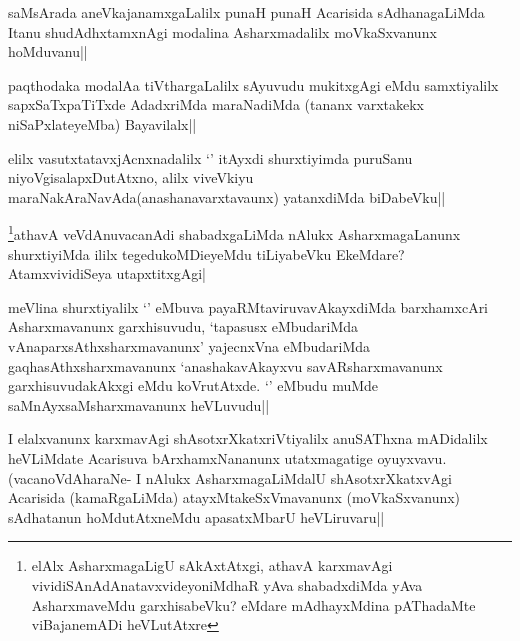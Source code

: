 \begin{artha}
saMsArada aneVkajanamxgaLalilx punaH punaH Acarisida sAdhanagaLiMda Itanu shudAdhxtamxnAgi modalina Asharxmadalilx moVkaSxvanunx hoMduvanu||
\end{artha}


\begin{artha}
paqthodaka modalAa tiVthargaLalilx sAyuvudu mukitxgAgi eMdu samxtiyalilx sapxSaTxpaTiTxde AdadxriMda maraNadiMda (tananx varxtakekx niSaPxlateyeMba) Bayavilalx||
\end{artha}

\begin{artha}
elilx vasutxtatavxjAcnxnadalilx `\stext' itAyxdi shurxtiyimda puruSanu niyoVgisalapxDutAtxno, alilx viveVkiyu maraNakAraNavAda(anashanavarxtavaunx) yatanxdiMda biDabeVku||
\end{artha}

\begin{artha}
\footnote{elAlx AsharxmagaLigU sAkAxtAtxgi, athavA karxmavAgi vividiSAnAdAnatavxvideyoniMdhaR yAva shabadxdiMda yAva AsharxmaveMdu garxhisabeVku? eMdare mAdhayxMdina pAThadaMte viBajanemADi heVLutAtxre}athavA veVdAnuvacanAdi shabadxgaLiMda nAlukx AsharxmagaLanunx shurxtiyiMda ililx tegedukoMDieyeMdu tiLiyabeVku EkeMdare? AtamxvividiSeya utapxtitxgAgi|
\end{artha}


\begin{artha}
meVlina shurxtiyalilx `\stext' eMbuva payaRMtaviruvavAkayxdiMda barxhamxcAri Asharxmavanunx garxhisuvudu, `tapasusx eMbudariMda vAnaparxsAthxsharxmavanunx' yajecnxVna eMbudariMda gaqhasAthxsharxmavanunx `anashakavAkayxvu savARsharxmavanunx garxhisuvudakAkxgi eMdu koVrutAtxde. `\stext' eMbudu muMde saMnAyxsaMsharxmavanunx heVLuvudu||
\end{artha}


\begin{artha}
I elalxvanunx karxmavAgi shAsotxrXkatxriVtiyalilx anuSAThxna mADidalilx heVLiMdate Acarisuva bArxhamxNananunx utatxmagatige oyuyxvavu. (vacanoVdAharaNe- I nAlukx AsharxmagaLiMdalU shAsotxrXkatxvAgi Acarisida (kamaRgaLiMda) atayxMtakeSxVmavanunx (moVkaSxvanunx) sAdhatanun hoMdutAtxneMdu apasatxMbarU heVLiruvaru||
\end{artha}

